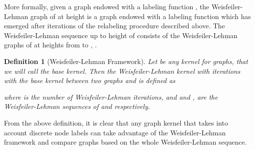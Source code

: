 \documentclass[twoside,11pt]{article}
\newtheorem{definition}{Definition}
\begin{document}
More formally, given a graph  endowed with a labeling function , the Weisfeiler-Lehman graph of  at height  is a graph  endowed with a labeling function  which has emerged after  iterations of the relabeling procedure described above.
The Weisfeiler-Lehman sequence up to height  of  consists of the Weisfeiler-Lehman graphs of  at heights from  to , . 
\begin{definition}[Weisfeiler-Lehman Framework]
  Let  be any kernel for graphs, that we will call the base kernel.
  Then the Weisfeiler-Lehman kernel with  iterations with the base kernel  between two graphs  and  is defined as
  
  where  is the number of Weisfeiler-Lehman iterations, and  and ,  are the Weisfeiler-Lehman sequences of  and  respectively.
\end{definition}
From the above definition, it is clear that any graph kernel that takes into account discrete node labels can take advantage of the Weisfeiler-Lehman framework and compare graphs based on the whole Weisfeiler-Lehman sequence.
\end{document}
